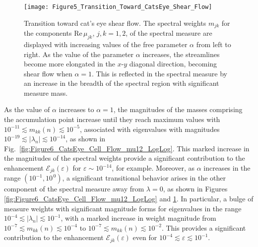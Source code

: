 \documentclass[english,12pt,jmp,graphicx]{revtex4-1}
\newcommand{\figref}[1]{Fig.~\ref{#1}}
\newcommand{\numfigref}[1]{\ref{#1}}
\newcommand{\Real}{\mbox{Re}\,}
\begin{document}
%
\begin{figure}[t]
  \centerline{\texttt{[image: Figure5\_Transition\_Toward\_CatsEye\_Shear\_Flow]}} 
\caption{%
  Transition toward cat's eye shear flow. The spectral weights
  $m_{jk}$ for the components $\Real\mu_{jk}$, $j,k=1,2$, of the
  spectral measure are displayed with increasing values of the free
  parameter $\alpha$ from left to right. As the value of the parameter $\alpha$
  increases, the streamlines become more elongated in the $x$-$y$
  diagonal direction, becoming shear flow when $\alpha=1$. This is
  reflected in the spectral measure by an increase in the breadth of
  the spectral region with significant measure mass.
        }
\label{fig:Figure4_Transition_Toward_CatsEye_Shear_Flow}
\end{figure}
%




As the value of $\alpha$ increases to  $\alpha=1$,
the magnitudes of the masses comprising the accumulation point 
increase until they reach maximum values with
$10^{-11}\lesssim m_{kk}(n)\lesssim10^{-5}$,
associated with eigenvalues
with magnitudes $10^{-19}\lesssim|\lambda_n|\lesssim10^{-14}$, as
shown in \figref{fig:Figure6_CatsEye_Cell_Flow_mu12_LogLog}. This
marked increase in the magnitudes of the spectral weights provide a
significant contribution to the enhancement 
$\mathcal{E}_{jk}(\varepsilon)$ for $\varepsilon\sim10^{-14}$, for
example. Moreover, as 
$\alpha$ increases in the range $(10^{-1},10^{\,0})$, a significant
transitional behavior arises in the other component of the spectral
measure away from $\lambda=0$, as shown in Figures
\numfigref{fig:Figure6_CatsEye_Cell_Flow_mu12_LogLog} and
\numfigref{fig:Figure4_Transition_Toward_CatsEye_Shear_Flow}. In 
particular,
a bulge of measure weights with significant magnitude forms for
eigenvalues in the range
$10^{-4}\lesssim|\lambda_n|\lesssim10^{-1}$,
with a marked increase in weight magnitude from
$10^{-7}\lesssim m_{kk}(n)\lesssim10^{-4}$
to
$10^{-7}\lesssim m_{kk}(n)\lesssim10^{-2}$. This provides a
significant contribution to the enhancement
$\mathcal{E}_{jk}(\varepsilon)$ even for
$10^{-4}\lesssim\varepsilon\lesssim10^{-1}$. 
\end{document}
